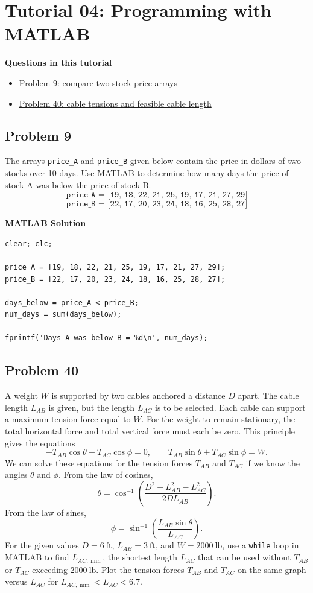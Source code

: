 \documentclass[12pt]{article}
\newcommand{\tutorialsection}[2]{%
    \clearpage
    \phantomsection
    \hypertarget{#1}{}%
    \section*{#2}
}
\newcommand{\questiontitle}[2]{%
    \phantomsection
    \hypertarget{#1}{}%
    \subsection*{#2}
}
\newcommand{\solutiontitle}{\noindent\textbf{MATLAB Solution}}
\newcommand{\minitoc}[1]{%
    \noindent\textbf{Questions in this tutorial}
    \begin{itemize}[leftmargin=1.5em, itemsep=0.2em]
        #1
    \end{itemize}
}
\begin{document}
\tutorialsection{tut4}{Tutorial 04: Programming with MATLAB}
\minitoc{
    \item \hyperlink{tut4-q9}{Problem 9: compare two stock-price arrays}
    \item \hyperlink{tut4-q40}{Problem 40: cable tensions and feasible cable length}
}

\questiontitle{tut4-q9}{Problem 9}
The arrays \texttt{price\_A} and \texttt{price\_B} given below contain the price in dollars of two stocks over 10 days. Use MATLAB to determine how many days the price of stock A was below the price of stock B.
\[
\texttt{price\_A = [19, 18, 22, 21, 25, 19, 17, 21, 27, 29]}
\]
\[
\texttt{price\_B = [22, 17, 20, 23, 24, 18, 16, 25, 28, 27]}
\]

\solutiontitle
\begin{lstlisting}
clear; clc;

price_A = [19, 18, 22, 21, 25, 19, 17, 21, 27, 29];
price_B = [22, 17, 20, 23, 24, 18, 16, 25, 28, 27];

days_below = price_A < price_B;
num_days = sum(days_below);

fprintf('Days A was below B = %d\n', num_days);
\end{lstlisting}

\questiontitle{tut4-q40}{Problem 40}
A weight $W$ is supported by two cables anchored a distance $D$ apart. The cable length $L_{AB}$ is given, but the length $L_{AC}$ is to be selected. Each cable can support a maximum tension force equal to $W$. For the weight to remain stationary, the total horizontal force and total vertical force must each be zero. This principle gives the equations
\[
-T_{AB}\cos\theta + T_{AC}\cos\phi = 0,
\qquad
T_{AB}\sin\theta + T_{AC}\sin\phi = W.
\]
We can solve these equations for the tension forces $T_{AB}$ and $T_{AC}$ if we know the angles $\theta$ and $\phi$. From the law of cosines,
\[
\theta = \cos^{-1}\!\left(\frac{D^{2} + L_{AB}^{2} - L_{AC}^{2}}{2DL_{AB}}\right).
\]
From the law of sines,
\[
\phi = \sin^{-1}\!\left(\frac{L_{AB}\sin\theta}{L_{AC}}\right).
\]
For the given values $D = 6~\text{ft}$, $L_{AB} = 3~\text{ft}$, and $W = 2000~\text{lb}$, use a \texttt{while} loop in MATLAB to find $L_{AC,\min}$, the shortest length $L_{AC}$ that can be used without $T_{AB}$ or $T_{AC}$ exceeding $2000~\text{lb}$. Plot the tension forces $T_{AB}$ and $T_{AC}$ on the same graph versus $L_{AC}$ for $L_{AC,\min} < L_{AC} < 6.7$.
\end{document}
